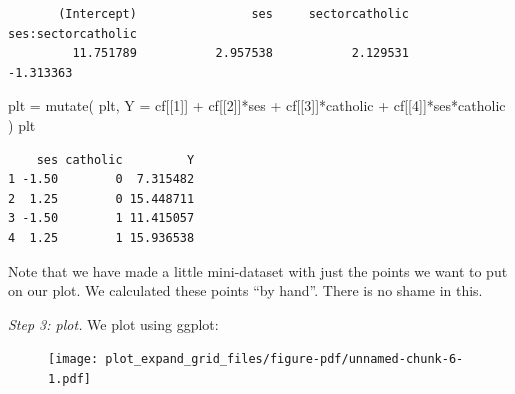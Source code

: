 \documentclass[
  letterpaper,
  DIV=11,
  numbers=noendperiod]{scrreprt}
\newenvironment{Shaded}{\begin{snugshade}}{\end{snugshade}}
\newcommand{\AttributeTok}[1]{\textcolor[rgb]{0.49,0.56,0.16}{#1}}
\newcommand{\DecValTok}[1]{\textcolor[rgb]{0.25,0.63,0.44}{#1}}
\newcommand{\FunctionTok}[1]{\textcolor[rgb]{0.02,0.16,0.49}{#1}}
\newcommand{\NormalTok}[1]{\textcolor[rgb]{0.00,0.44,0.13}{#1}}
\newcommand{\OtherTok}[1]{\textcolor[rgb]{0.00,0.44,0.13}{#1}}
\newcommand{\SpecialCharTok}[1]{\textcolor[rgb]{0.25,0.44,0.63}{#1}}
\newcommand{\StringTok}[1]{\textcolor[rgb]{0.25,0.44,0.63}{#1}}
\begin{document}
\begin{verbatim}
       (Intercept)                ses     sectorcatholic ses:sectorcatholic 
         11.751789           2.957538           2.129531          -1.313363 
\end{verbatim}

\begin{Shaded}
\begin{Highlighting}[]
\NormalTok{plt }\OtherTok{=} \FunctionTok{mutate}\NormalTok{( plt,}
              \AttributeTok{Y =}\NormalTok{ cf[[}\DecValTok{1}\NormalTok{]] }\SpecialCharTok{+}\NormalTok{ cf[[}\DecValTok{2}\NormalTok{]]}\SpecialCharTok{*}\NormalTok{ses }\SpecialCharTok{+}\NormalTok{ cf[[}\DecValTok{3}\NormalTok{]]}\SpecialCharTok{*}\NormalTok{catholic }\SpecialCharTok{+}\NormalTok{ cf[[}\DecValTok{4}\NormalTok{]]}\SpecialCharTok{*}\NormalTok{ses}\SpecialCharTok{*}\NormalTok{catholic )}
\NormalTok{plt}
\end{Highlighting}
\end{Shaded}

\begin{verbatim}
    ses catholic         Y
1 -1.50        0  7.315482
2  1.25        0 15.448711
3 -1.50        1 11.415057
4  1.25        1 15.936538
\end{verbatim}

Note that we have made a little mini-dataset with just the points we
want to put on our plot. We calculated these points ``by hand''. There
is no shame in this.

\emph{Step 3: plot.} We plot using ggplot:

\begin{Shaded}
\end{Shaded}

\begin{figure}[H]

{\centering \texttt{[image: plot\_expand\_grid\_files/figure-pdf/unnamed-chunk-6-1.pdf]}

}

\end{figure}
\end{document}
